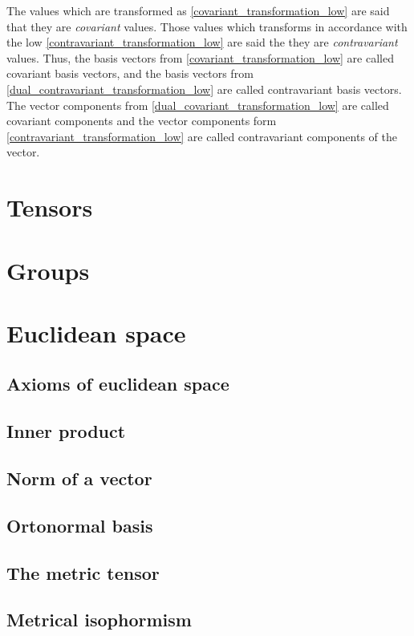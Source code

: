 \documentclass{book}
\begin{document}
The values which are transformed as \eqref{covariant_transformation_low} are said that they are \emph{covariant} values. Those values which transforms in accordance with the low \eqref{contravariant_transformation_low} are said the they are \emph{contravariant} values. Thus, the  basis vectors from \eqref{covariant_transformation_low} are called covariant basis vectors, and the basis vectors from \eqref{dual_contravariant_transformation_low} are called contravariant basis vectors. The vector components from \eqref{dual_covariant_transformation_low} are called covariant components and the vector components form \eqref{contravariant_transformation_low} are called  contravariant components of the vector.

\chapter{Tensors}

\chapter{Groups}

\chapter{Euclidean space}

\section{Axioms of euclidean space}

\section{Inner product}

\section{Norm of a vector}

\section{Ortonormal basis}

\section{The metric tensor}

\section{Metrical isophormism}
\end{document}
